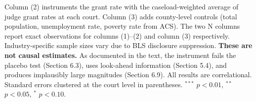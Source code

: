 \begin{table}[htbp]
\begin{minipage}{0.9\textwidth}
Column (2) instruments the grant rate with the caseload-weighted average of judge grant rates at each court.
Column (3) adds county-level controls (total population, unemployment rate, poverty rate from ACS).
The two N columns report exact observations for columns (1)--(2) and column (3) respectively.
Industry-specific sample sizes vary due to BLS disclosure suppression.
\textbf{These are not causal estimates.} As documented in the text, the instrument fails the placebo test
(Section 6.3), uses look-ahead information (Section 5.4), and produces implausibly large magnitudes
(Section 6.9). All results are correlational.
Standard errors clustered at the court level in parentheses.
$^{***}$ $p<0.01$, $^{**}$ $p<0.05$, $^{*}$ $p<0.10$.
\end{minipage}
\end{table}
